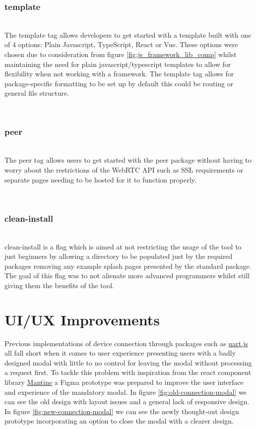\documentclass{l4proj}
\begin{document}
\subsubsection{template}\hfill\\
The template tag allows developers to get started with a template built with one of 4 options: Plain Javascript, TypeScript, React or Vue. These options were chosen due to consideration from figure \ref{fig:js_framework_lib_comp} whilst maintaining the need for plain javascript/typescript templates to allow for flexibility when not working with a framework. The template tag allows for package-specific formatting to be set up by default this could be routing or general file structure.

\text \\

\subsubsection{peer}\hfill\\
The peer tag allows users to get started with the peer package without having to worry about the restrictions of the WebRTC API such as SSL requirements or separate pages needing to be hosted for it to function properly.

\text \\

\subsubsection{clean-install}\hfill\\
clean-install is a flag which is aimed at not restricting the usage of the tool to just beginners by allowing a directory to be populated just by the required packages removing any example splash pages presented by the standard package. The goal of this flag was to not alienate more advanced programmers whilst still giving them the benefits of the tool.

\section{UI/UX Improvements}
Previous implementations of device connection through packages such as \href{https://www.espruino.com/UART.js}{uart.js} all fall short when it comes to user experience presenting users with a badly designed modal with little to no control for leaving the modal without processing a request first. To tackle this problem with inspiration from the react component library \href{https://mantine.dev/}{Mantine} a Figma prototype was prepared to improve the user interface and experience of the mandatory modal. In figure \ref{fig:old-connection-modal} we can see the old design with layout issues and a general lack of responsive design. In figure \ref{fig:new-connection-modal} we can see the newly thought-out design prototype incorporating an option to close the modal with a clearer design. 
\end{document}
